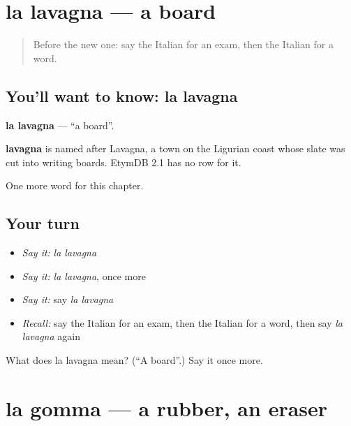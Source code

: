 \section[la lavagna]{la lavagna — a board}

\label{lesson:IT-C114-lavagna}



\begin{quote}
Before the new one: say the Italian for an exam, then the Italian for a word.
\end{quote}

\subsection*{You'll want to know: la lavagna}
\textbf{la lavagna} — \textquotedblleft{}a board\textquotedblright{}.

\begin{cousinweb}
\textbf{lavagna} is named after Lavagna, a town on the Ligurian coast whose slate was cut into writing boards. EtymDB 2.1 has no row for it.
\end{cousinweb}

\begin{grammarlens}[title={What you've built}]
One more word for this chapter.
\end{grammarlens}

\subsection*{Your turn}
\begin{itemize}
\raggedright
  \item \emph{Say it:} \emph{la lavagna}
  \item \emph{Say it:} \emph{la lavagna}, once more
  \item \emph{Say it:} say \emph{la lavagna}
  \item \emph{Recall:} say the Italian for an exam, then the Italian for a word, then say \emph{la lavagna} again
\end{itemize}

\begin{tcolorbox}[breakable,colback=teal!4,colframe=teal!35!black,title={Before you move on}]
What does la lavagna mean? (\textquotedblleft{}A board\textquotedblright{}.) Say it once more.
\end{tcolorbox}
\section[la gomma]{la gomma — a rubber, an eraser}

